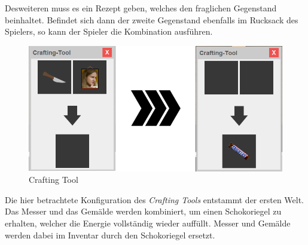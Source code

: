 \documentclass[12pt,twoside]{article}
\theoremstyle{plain}
\theoremstyle{definition}
\theoremstyle{remark}
\begin{document}
Desweiteren muss es ein Rezept geben, welches den fraglichen Gegenstand beinhaltet.
Befindet sich dann der zweite Gegenstand ebenfalls im Rucksack des Spielers, so kann der Spieler die Kombination ausführen.\\
\begin{figure}[h!bt]
    \begin{center}
        \includegraphics[scale=0.5]{craftingUI.png}
    	\caption{Crafting Tool}
        \label{fig:main_craft}
    \end{center}
\end{figure}
Die hier betrachtete Konfiguration des \textit{Crafting Tools} entstammt der ersten Welt.
Das Messer und das Gemälde werden kombiniert, um einen Schokoriegel zu erhalten, welcher die Energie vollständig wieder auffüllt.
Messer und Gemälde werden dabei im Inventar durch den Schokoriegel ersetzt.

%
%
\end{document}
